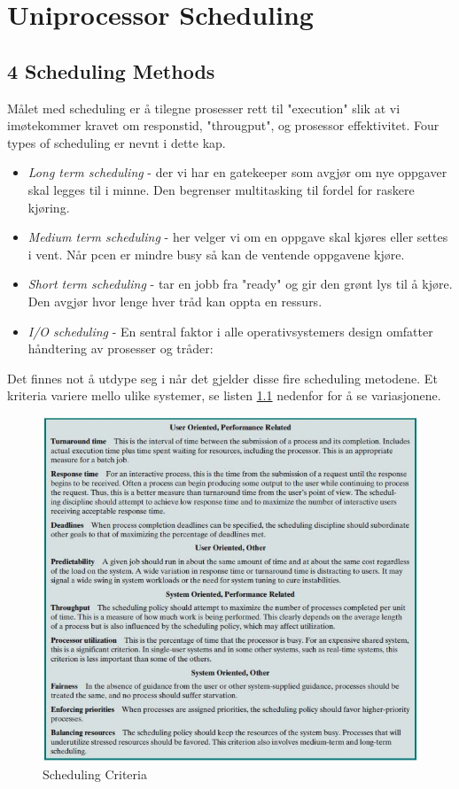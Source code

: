 \chapter{Uniprocessor Scheduling}
\section{4 Scheduling Methods}
Målet med scheduling er å tilegne prosesser rett til "execution" slik at vi imøtekommer kravet om responstid, "througput", og prosessor effektivitet. 
Four types of scheduling er nevnt i dette kap. 
\begin{itemize}
\item 
\emph{Long term scheduling} - der vi har en gatekeeper som avgjør om nye oppgaver skal legges til i minne. Den begrenser multitasking til fordel for raskere kjøring.
\item 
\emph{Medium term scheduling} - her velger vi om en oppgave skal kjøres eller settes i vent. Når pcen er mindre busy så kan de ventende oppgavene kjøre.
\item 
\emph{Short term scheduling }- tar en jobb fra "ready" og gir den grønt lys til å kjøre. Den avgjør hvor lenge hver tråd kan oppta en ressurs. 
\item 
\emph{I/O scheduling }- En sentral faktor i alle operativsystemers design omfatter håndtering av prosesser og tråder: 
\end{itemize}

Det finnes not å utdype seg i når det gjelder disse fire scheduling metodene. Et kriteria variere mello ulike systemer, se listen \ref{fig:critera_sc} nedenfor for å se variasjonene. 

\begin{figure}
\centering
\includegraphics{img/scheduling.JPG}
\caption{Scheduling Criteria}
\label{fig:critera_sc}
\end{figure}

